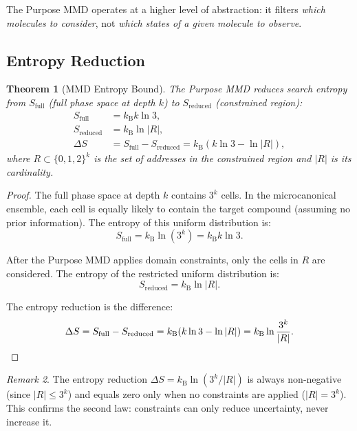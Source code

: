 \documentclass[11pt,twocolumn,a4paper]{article}
\newtheorem{theorem}{Theorem}[section]
\theoremstyle{definition}
\theoremstyle{remark}
\newtheorem{remark}[theorem]{Remark}
\newcommand{\kB}{k_{\mathrm{B}}}
\begin{document}
The Purpose MMD operates at a higher level of abstraction: it filters \emph{which molecules to consider}, not \emph{which states of a given molecule to observe}.

\subsection{Entropy Reduction}\label{sec:entropy-reduction}

\begin{theorem}[MMD Entropy Bound]\label{thm:mmd-entropy}
The Purpose MMD reduces search entropy from $S_{\mathrm{full}}$ (full phase space at depth $k$) to $S_{\mathrm{reduced}}$ (constrained region):
\begin{align}
  S_{\mathrm{full}} &= \kB k \ln 3, \label{eq:s-full} \\
  S_{\mathrm{reduced}} &= \kB \ln |R|, \label{eq:s-reduced} \\
  \Delta S &= S_{\mathrm{full}} - S_{\mathrm{reduced}} = \kB(k \ln 3 - \ln |R|), \label{eq:delta-s}
\end{align}
where $R \subset \{0,1,2\}^k$ is the set of addresses in the constrained region and $|R|$ is its cardinality.
\end{theorem}

\begin{proof}
The full phase space at depth $k$ contains $3^k$ cells. In the microcanonical ensemble, each cell is equally likely to contain the target compound (assuming no prior information). The entropy of this uniform distribution is:
\begin{equation}
  S_{\mathrm{full}} = \kB \ln(3^k) = \kB k \ln 3.
\end{equation}

After the Purpose MMD applies domain constraints, only the cells in $R$ are considered. The entropy of the restricted uniform distribution is:
\begin{equation}
  S_{\mathrm{reduced}} = \kB \ln |R|.
\end{equation}

The entropy reduction is the difference:
\begin{equation}
  \Delta S = S_{\mathrm{full}} - S_{\mathrm{reduced}} = \kB(k \ln 3 - \ln |R|) = \kB \ln \frac{3^k}{|R|}. \qedhere
\end{equation}
\end{proof}

\begin{remark}
The entropy reduction $\Delta S = \kB \ln(3^k / |R|)$ is always non-negative (since $|R| \leq 3^k$) and equals zero only when no constraints are applied ($|R| = 3^k$). This confirms the second law: constraints can only reduce uncertainty, never increase it.
\end{remark}
\end{document}
